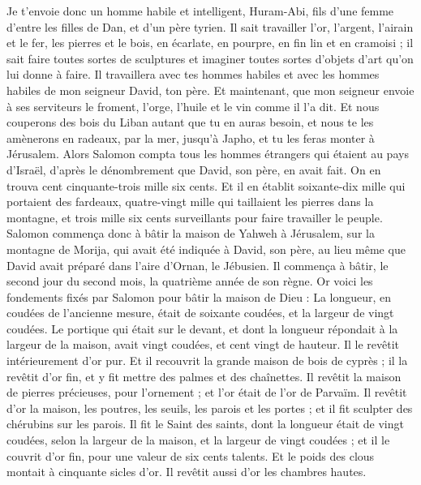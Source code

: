 \begin{multicols}{2}
Je t'envoie donc un homme habile et intelligent, Huram-Abi,
fils d'une femme d'entre les filles de Dan, et d'un père tyrien. Il sait travailler l'or, l'argent, l'airain et le fer, les pierres et le bois, en écarlate, en pourpre, en fin lin et en cramoisi ; il sait faire toutes sortes de sculptures et imaginer toutes sortes d'objets d'art qu'on lui donne à faire. Il travaillera avec tes hommes habiles et avec les hommes habiles de mon seigneur David, ton père.
Et maintenant, que mon seigneur envoie à ses serviteurs le froment, l'orge, l'huile et le vin comme il l'a dit.
Et nous couperons des bois du Liban autant que tu en auras besoin, et nous te les amènerons en radeaux, par la mer, jusqu'à Japho, et tu les feras monter à Jérusalem.
Alors Salomon compta tous les hommes étrangers qui étaient au pays d'Israël, d’après le dénombrement que David, son père, en avait fait. On en   trouva cent cinquante-trois mille six cents.
Et il en établit soixante-dix mille qui portaient des fardeaux, quatre-vingt mille qui taillaient les pierres dans la montagne, et trois mille six cents surveillants pour faire travailler le peuple.
\VerseOne{}Salomon commença donc à bâtir la maison de Yahweh à Jérusalem, sur la montagne de Morija, qui avait été indiquée à David, son père, au lieu même que David avait préparé dans l'aire d'Ornan, le Jébusien.
Il commença à bâtir, le second jour du second mois, la quatrième année de son règne.
Or voici les fondements fixés par Salomon pour bâtir la maison de Dieu : La longueur, en coudées de l'ancienne mesure, était de soixante coudées, et la largeur de vingt coudées.
Le portique qui était sur le devant, et dont la longueur répondait à la largeur de la maison, avait vingt coudées, et cent vingt de hauteur. Il le revêtit intérieurement d'or pur.
Et il recouvrit la grande maison de bois de cyprès ; il la revêtit d'or fin, et y fit mettre des palmes et des chaînettes.
Il revêtit la maison de pierres précieuses, pour l'ornement ; et l'or était de l'or de Parvaïm.
Il revêtit d'or la maison, les poutres, les seuils, les parois et les portes ; et il fit sculpter des chérubins sur les parois.
Il fit le Saint des saints, dont la longueur était de vingt coudées, selon la largeur de la maison, et la largeur de vingt coudées ; et il le couvrit d'or fin, pour une valeur de six cents talents.
Et le poids des clous montait à cinquante sicles d'or. Il revêtit aussi d'or les chambres hautes.

\end{multicols}
